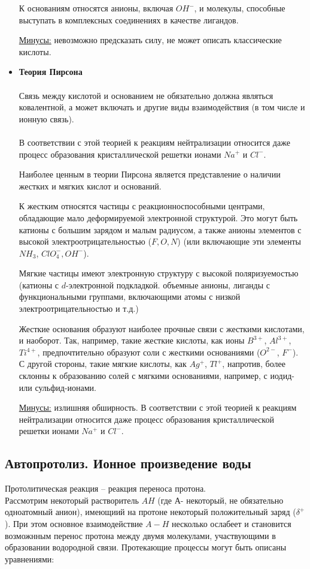 \documentclass[14pt,a4paper]{scrartcl}
\begin{document}
\begin{itemize}
 	К основаниям относятся анионы, включая $OH^-$, и молекулы, способные выступать в комплексных  соединениях в качестве лигандов.
 
 	\ul{Минусы:} невозможно предсказать силу, не может описать классические кислоты.

	\item \textbf{Теория Пирсона}\\\\
	Связь между кислотой и основанием не обязательно должна являться ковалентной, а может включать и другие виды взаимодействия (в том числе и ионную связь). \\\\
	В соответствии с этой теорией к реакциям нейтрализации относится даже процесс образования кристаллической решетки ионами $Na^+$ и $Cl^-$.

	Наиболее ценным в теории Пирсона является представление о наличии жестких и мягких кислот и оснований. 

	К жестким относятся частицы с реакционноспособными центрами, обладающие мало деформируемой электронной структурой. Это могут быть катионы с большим зарядом и малым радиусом, а также анионы элементов с высокой электроотрицательностью ($F, O, N$) (или включающие эти элементы $NH_3$, $ClO_4^-, OH^-$).

	Мягкие частицы имеют электронную структуру с высокой поляризуемостью (катионы с $d$-электронной подкладкой. объемные анионы, лиганды с функциональными группами, включающими атомы с низкой электроотрицательностью и т.д.)

	Жесткие основания образуют наиболее прочные связи с жесткими кислотами, и наоборот. Так, например, такие жесткие кислоты, как ионы $B^{3+}$, $Al^{3+}$, $Ti^{4+}$, предпочтительно образуют соли с жесткими основаниями ($O^{2-}$, $F^-$). С другой стороны, такие мягкие кислоты, как $Ag^+$, $Tl^+$, напротив, более склонны к образованию солей с мягкими основаниями, например, с иодид- или сульфид-ионами.

	\ul{Минусы:} излишняя обширность. В соответствии с этой теорией к реакциям нейтрализации относится даже процесс образования кристаллической решетки ионами $Na^+$ и $Cl^-$.
\end{itemize}

\subsection*{Автопротолиз. Ионное произведение воды}
Протолитическая реакция -- реакция переноса протона. \\
Рассмотрим некоторый растворитель $AH$ (где $А$- некоторый, не обязательно одноатомный анион), имеющиий на протоне некоторый положительный заряд ($\delta^+$). При этом основное взаимодействие $A-H$ несколько ослабеет и становится возможнным перенос протона между двумя молекулами, участвующими в образовании водородной связи. Протекающие процессы могут быть описаны уравнениями:
\end{document}
